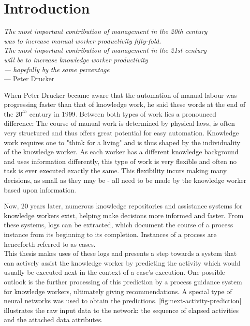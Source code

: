 \chapter{Introduction}\label{sec:intro}
\begin{flushright}{\slshape    
The most important contribution of management in the 20th century\\
was to increase manual worker productivity fifty-fold.\\
The most important contribution of management in the 21st century\\
will be to increase knowledge worker productivity\\
— hopefully by the same percentage} \\ \medskip
--- Peter Drucker~\cite{drucker1999}
\end{flushright}

When Peter Drucker became aware that the automation of manual labour was progressing faster than that of knowledge work, he said these words at the end of the $20^{th}$ century in 1999. Between both types of work lies a pronounced difference: The course of manual work is determined by physical laws, is often very structured and thus offers great potential for easy automation. Knowledge work requires one to "think for a living" and is thus shaped by the individuality of the knowledge worker. As each worker has a different knowledge background and uses information differently, this type of work is very flexible and often no task is ever executed exactly the same. This flexibility incurs making many decisions, as small as they may be - all need to be made by the knowledge worker based upon information.

Now, 20 years later, numerous knowledge repositories and assistance systems for knowledge workers exist, helping make decisions more informed and faster. From these systems, logs can be extracted, which document the course of a process instance from its beginning to its completion. Instances of a process are henceforth referred to as cases.\\

This thesis makes uses of these logs and presents a step towards a system that can actively assist the knowledge worker by predicting the activity which would usually be executed next in the context of a case's execution. One possible outlook is the further processing of this prediction by a process guidance system for knowledge workers, ultimately giving recommendations. A special type of neural networks was used to obtain the predictions. \autoref{fig:next-activity-prediction} illustrates the raw input data to the network: the sequence of elapsed activities and the attached data attributes.\\


